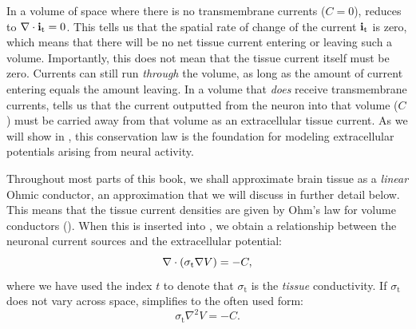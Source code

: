 In a volume of space where there is no transmembrane currents ($C = 0$),  reduces to ${\bf \nabla} \cdot {\bf i}_\text{t} = 0$. This tells us that the spatial rate of change of the current ${\bf i}_\text{t}$ is zero, which means that there will be no net tissue current entering or leaving such a volume. Importantly, this does not mean that the tissue current itself must be zero. Currents can still run \textit{through} the volume, as long as the amount of current entering equals the amount leaving. In a volume that \textit{does} receive transmembrane currents,  tells us that the current outputted from the neuron into that volume ($C$) must be carried away from that volume as an extracellular tissue current. As we will show in , this conservation law is the foundation for modeling extracellular potentials arising from neural activity.

Throughout most parts of this book, we shall approximate brain tissue as a \textit{linear} Ohmic conductor, an approximation that we will discuss in further detail below. This means that the tissue current densities are given by Ohm's law for volume conductors (). When this is inserted into , we obtain a relationship between the neuronal current sources and the extracellular potential:
\begin{equation}
{\bf \nabla} \cdot \left(\sigma_\text{t} {\bf \nabla} {V} \right) = -C,
\label{eq:Basics:continuity2}
\end{equation}
where we have used the index $t$ to denote that $\sigma_\text{t}$ is the \textit{tissue} conductivity. If $\sigma_\text{t}$ does not vary across space,  simplifies to the often used form:
\begin{equation}
\sigma_\text{t} \nabla^2{V} = -C.
\label{eq:Basics:continuity3}
\end{equation}


\subsection{}
\label{sec:Basics:interp_pot_brain}

